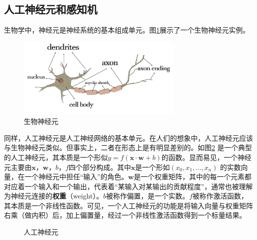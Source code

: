 \subsection{人工神经元和感知机}

\parinterval 生物学中，神经元是神经系统的基本组成单元。图\ref{fig:5-3}展示了一个生物神经元实例。

\begin{figure}[htp]
\centering
\includegraphics[width=8cm]{./Chapter5/Figures/biological-neuron.jpg}
\caption{生物神经元}
\label{fig:5-3}
\end{figure}

\parinterval 同样，人工神经元是人工神经网络的基本单元。在人们的想象中，人工神经元应该与生物神经元类似。但事实上，二者在形态上是有明显差别的。如图\ref{fig:5-4} 是一个典型的人工神经元，其本质是一个形似$ y=f(\mathbf x\cdot \mathbf w+b) $的函数。显而易见，一个神经元主要由$ \mathbf x $，$ \mathbf w $，$ b $，$ f $四个部分构成。其中$ \mathbf x $是一个形如$ (x_0,x_1,\dots,x_n) $ 的实数向量，在一个神经元中担任``输入''的角色。$ \mathbf w $是一个权重矩阵，其中的每一个元素都对应着一个输入和一个输出，代表着``某输入对某输出的贡献程度''，通常也被理解为神经元连接的{\small\sffamily\bfseries{权重}}（weight）。$ b $被称作偏置，是一个实数。$ f $被称作激活函数，其本质是一个非线性函数。可见，一个人工神经元的功能是将输入向量与权重矩阵右乘（做内积）后，加上偏置量，经过一个非线性激活函数得到一个标量结果。

\begin{figure}[htp]
\centering

\caption{人工神经元}
\label{fig:5-4}
\end{figure}


